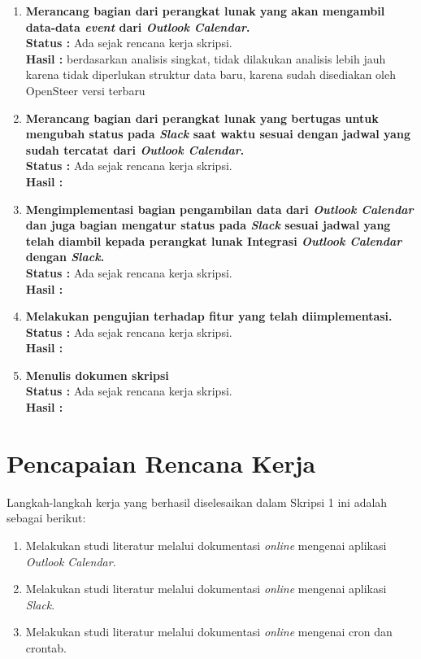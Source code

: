\documentclass[a4paper,twoside]{article}
\begin{document}
\begin{enumerate}
		\item \textbf{Merancang bagian dari perangkat lunak yang akan mengambil data-data \textit{event} dari \textit{Outlook Calendar}. }\\
		{\bf Status :} Ada sejak rencana kerja skripsi. \\
		{\bf Hasil :} berdasarkan analisis singkat, tidak dilakukan analisis lebih jauh karena tidak diperlukan struktur data baru, karena sudah disediakan oleh OpenSteer versi terbaru

		\item \textbf{Merancang bagian dari perangkat lunak yang bertugas untuk mengubah status pada \textit{Slack} saat waktu sesuai dengan jadwal yang sudah tercatat dari \textit{Outlook Calendar}.} \\
		{\bf Status :} Ada sejak rencana kerja skripsi.\\
		{\bf Hasil :}

		\item \textbf{Mengimplementasi bagian pengambilan data dari \textit{Outlook Calendar} dan juga bagian mengatur status pada \textit{Slack} sesuai jadwal yang telah diambil kepada perangkat lunak Integrasi \textit{Outlook Calendar} dengan \textit{Slack}.}\\
		{\bf Status :} Ada sejak rencana kerja skripsi.\\
		{\bf Hasil :}

		\item \textbf{Melakukan pengujian terhadap fitur yang telah diimplementasi.}\\
		{\bf Status :} Ada sejak rencana kerja skripsi.\\
		{\bf Hasil :} 
		
		\item \textbf{Menulis dokumen skripsi}\\
		{\bf Status :} Ada sejak rencana kerja skripsi.\\
		{\bf Hasil :} \lipsum[1]
		
	\end{enumerate}

\section{Pencapaian Rencana Kerja}
Langkah-langkah kerja yang berhasil diselesaikan dalam Skripsi 1 ini adalah sebagai berikut:
\begin{enumerate}
\item Melakukan studi literatur melalui dokumentasi \textit{online} mengenai aplikasi \textit{Outlook Calendar}.
\item Melakukan studi literatur melalui dokumentasi \textit{online} mengenai aplikasi \textit{Slack}.
\item Melakukan studi literatur melalui dokumentasi \textit{online} mengenai cron dan crontab. 
\end{enumerate}
\end{document}
